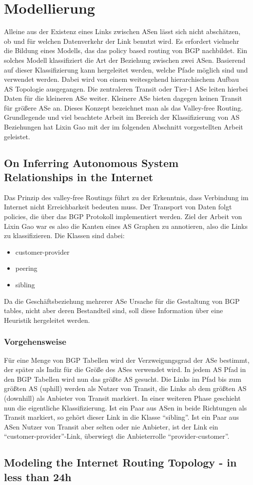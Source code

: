 \section{Modellierung}\label{sec:modellierung}

Alleine aus der Existenz eines Links zwischen ASen lässt sich nicht abschätzen, ob und für welchen Datenverkehr der Link benutzt wird.
Es erfordert vielmehr die Bildung eines Modells, das das policy based routing von BGP nachbildet.
Ein solches Modell klassifiziert die Art der Beziehung zwischen zwei ASen.
Basierend auf dieser Klassifizierung kann hergeleitet werden, welche Pfade möglich sind und verwendet werden.
Dabei wird von einem weitesgehend hierarchischem Aufbau AS Topologie ausgegangen.
Die zentraleren Transit oder Tier-1 ASe leiten hierbei Daten für die kleineren ASe weiter.
Kleinere ASe bieten dagegen keinen Transit für größere ASe an.
Dieses Konzept bezeichnet man als das Valley-free Routing.
Grundlegende und viel beachtete Arbeit im Bereich der Klassifizierung von AS Beziehungen hat Lixin Gao mit der im folgenden Abschnitt vorgestellten Arbeit geleistet.

\subsection{On Inferring Autonomous System Relationships in the Internet~\cite{Gao:2001:IAS:504611.504616}}
Das Prinzip des valley-free Routings führt zu der Erkenntnis, dass Verbindung im Internet nicht Erreichbarkeit bedeuten muss.
Der Transport von Daten folgt policies, die über das BGP Protokoll implementiert werden.
Ziel der Arbeit von Lixin Gao war es also die Kanten eines AS Graphen zu annotieren, also die Links zu klassifizieren.
Die Klassen sind dabei:
\begin{itemize}
  \item customer-provider
  \item peering
  \item sibling
\end{itemize}
Da die Geschäftsbeziehung mehrerer ASe Ursache für die Gestaltung von BGP tables, nicht aber deren Bestandteil sind, soll diese Information über eine Heuristik hergeleitet werden.

\subsubsection{Vorgehensweise}
Für eine Menge von BGP Tabellen wird der Verzweigungsgrad der ASe bestimmt, der später als Indiz für die Größe des ASes verwendet wird.
In jedem AS Pfad in den BGP Tabellen wird nun das größte AS gesucht.
Die Links im Pfad bis zum größten AS (uphill) werden als Nutzer von Transit, die Links ab dem größten AS (downhill) als Anbieter von Transit markiert.
In einer weiteren Phase geschieht nun die eigentliche Klassifizierung.
Ist ein Paar aus ASen in beide Richtungen als Transit markiert, so gehört dieser Link in die Klasse "`sibling"'.
Ist ein Paar aus ASen Nutzer von Transit aber selten oder nie Anbieter, ist der Link ein "`customer-provider"'-Link, überwiegt die Anbieterrolle "`provider-customer"'.

\subsection{Modeling the Internet Routing Topology - in less than 24h~\cite{conf/pads/Winter09}}
